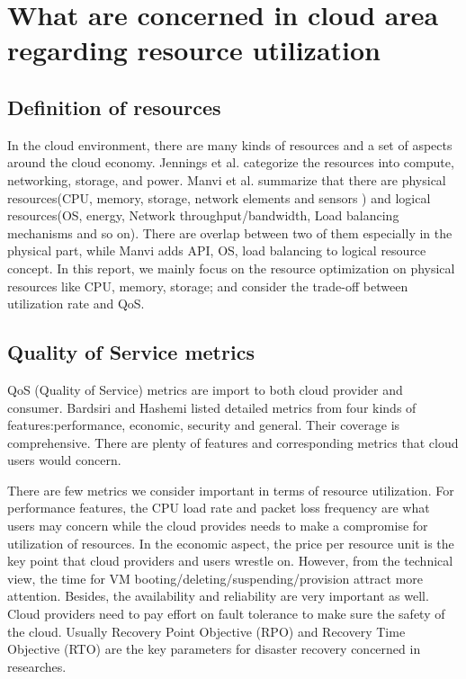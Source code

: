 \documentclass[sigchi]{acmart}
\begin{document}
\section{What are concerned in cloud area regarding resource utilization}
\subsection{Definition of resources}

In the cloud environment, there are many kinds of resources and a set of aspects around the cloud economy.
Jennings et al.\cite{Jennings2015} categorize the resources into compute, networking, storage, and power. 
Manvi et al.\cite{Manvi2014} summarize that there are physical resources(CPU, memory, storage, network elements and sensors ) and logical resources(OS, energy, Network throughput/bandwidth, Load balancing mechanisms and so on).
There are overlap between two of them especially in the physical part, while Manvi adds API, OS, load balancing to logical resource concept.
In this report, we mainly focus on the resource optimization on physical resources like CPU, memory, storage; and consider the trade-off between utilization rate and QoS.

\subsection{Quality of Service metrics}
QoS (Quality of Service) metrics are import to both cloud provider and consumer.
Bardsiri and Hashemi listed detailed metrics from four kinds of features:performance, economic, security and general. \cite{Bardsiri2014}
Their coverage is comprehensive. There are plenty of features and corresponding metrics that cloud users would concern.

There are few metrics we consider important in terms of resource utilization. 
For performance features, the CPU load rate and packet loss frequency are what users may concern while the cloud provides needs to make a compromise for utilization of resources.
In the economic aspect, the price per resource unit is the key point that cloud  providers and users wrestle on. However, from the technical view, the time for VM booting/deleting/suspending/provision attract more attention.
Besides, the availability and reliability are very important as well. 
Cloud providers need to pay effort on fault tolerance to make sure the safety of the cloud.
Usually Recovery Point Objective (RPO) and Recovery Time Objective (RTO) are the key parameters for disaster recovery concerned in researches.
\end{document}
